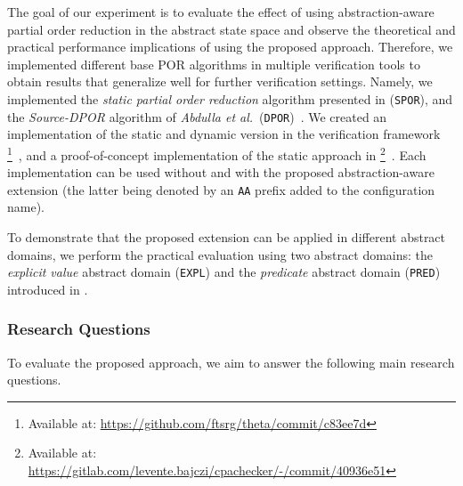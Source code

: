 \documentclass[numbook]{svjour3}
\begin{document}
The goal of our experiment is to evaluate the effect of using abstraction-aware partial order reduction in the abstract state space and observe the theoretical and practical performance implications of using the proposed approach. Therefore, we implemented different base POR algorithms in multiple verification tools to obtain results that generalize well for further verification settings. Namely, we implemented the \emph{static partial order reduction} algorithm presented in  (\texttt{SPOR}), and the \emph{Source-DPOR} algorithm of \emph{Abdulla et al.}~(\texttt{DPOR})~\cite{optimal_dpor}. We created an implementation of the static and dynamic version in the verification framework \Th\footnote{Available at: \href{https://github.com/ftsrg/theta/commit/c83ee7d53aff91baff79f97818f1320e75e95077}{https://github.com/ftsrg/theta/commit/c83ee7d}}~\cite{theta}, and a proof-of-concept implementation of the static approach in \CPA\footnote{Available at: \href{https://gitlab.com/levente.bajczi/cpachecker/-/commit/40936e5158b9a9f92f06e1ad00e1d5ed618b9122}{https://gitlab.com/levente.bajczi/cpachecker/-/commit/40936e51}}~\cite{cpachecker}. Each implementation can be used without and with the proposed abstraction-aware extension (the latter being denoted by an \texttt{AA} prefix added to the configuration name).

To demonstrate that the proposed extension can be applied in different abstract domains, we perform the practical evaluation using two abstract domains: the \emph{explicit value} abstract domain (\texttt{EXPL}) and the \emph{predicate} abstract domain (\texttt{PRED}) introduced in .

\subsubsection{Research Questions}
\label{sec:por-rq}

To evaluate the proposed approach, we aim to answer the following main research questions.

\begin{description}
\end{description}
\end{document}
